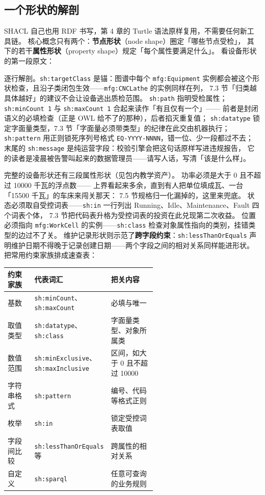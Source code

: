 \subsection{一个形状的解剖}

SHACL 自己也用 RDF 书写，第 4 章的 Turtle 语法原样复用，不需要任何新工具链。
核心概念只有两个：\textbf{节点形状}（node shape）圈定「哪些节点受检」，
其下的若干\textbf{属性形状}（property shape）规定「每个属性要满足什么」。
看设备形状的第一段原文：



逐行解剖。\texttt{sh:targetClass} 是锚：图谱中每个 \texttt{mfg:Equipment}
实例都会被这个形状检查，且沿子类闭包生效——\texttt{mfg:CNCLathe} 的实例同样在列，
7.3 节「归类越具体越好」的建议不会让设备逃出质检范围。
\texttt{sh:path} 指明受检属性；
\texttt{sh:minCount 1} 与 \texttt{sh:maxCount 1} 合起来读作「有且仅有一个」——
前者是封闭语义的必填检查（正是 OWL 给不了的那种），后者掐灭重复值；
\texttt{sh:datatype} 锁定字面量类型，7.3 节「字面量必须带类型」的纪律在此交由机器执行；
\texttt{sh:pattern} 用正则锁死序列号格式 \texttt{EQ-YYYY-NNNN}，错一位、少一段都过不去；
末尾的 \texttt{sh:message} 是纯运营字段：校验引擎会把这句话原样写进违规报告，
它的读者是凌晨被告警叫起来的数据管理员——请写人话，写清「该是什么样」。

完整的设备形状还有三段属性形状（见包内教学资产）。
功率必须是大于 0 且不超过 10000 千瓦的浮点数——
上界看起来多余，直到有人把单位填成瓦、一台「15500 千瓦」的车床来闯关那天：
7.5 节规格归一化漏掉的，这里来兜底。
状态必须取自受控词表——\texttt{sh:in} 一行列出
Running、Idle、Maintenance、Fault 四个词表个体，
7.3 节把代码表升格为受控词表的投资在此兑现第二次收益。
位置必须指向 \texttt{mfg:WorkCell} 的实例——\texttt{sh:class}
检查对象属性指向的类别，挂错类型的边过不了关。
维护记录形状则示范了\textbf{跨字段约束}：\texttt{sh:lessThanOrEquals}
声明维护日期不得晚于记录创建日期——两个字段之间的相对关系同样能进形状。
把常用约束家族排成速查表：

\begin{center}
\begin{tabularx}{\linewidth}{@{}p{0.18\linewidth}p{0.40\linewidth}X@{}}
\toprule
\textbf{约束家族} & \textbf{代表词汇} & \textbf{把关内容} \\
\midrule
基数 & \texttt{sh:minCount}、\texttt{sh:maxCount} & 必填与唯一 \\
取值类型 & \texttt{sh:datatype}、\texttt{sh:class} & 字面量类型、对象所属类 \\
数值范围 & \texttt{sh:minExclusive}、\texttt{sh:maxInclusive} & 区间，如大于 0 且不超过 10000 \\
字符串格式 & \texttt{sh:pattern} & 编号、代码等格式正则 \\
枚举 & \texttt{sh:in} & 锁定受控词表取值 \\
字段间比较 & \texttt{sh:lessThanOrEquals} 等 & 跨属性的相对关系 \\
自定义 & \texttt{sh:sparql} & 任意可查询的业务规则 \\
\bottomrule
\end{tabularx}
\end{center}

